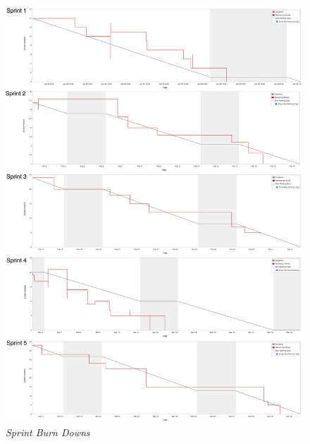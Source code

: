 \vfill
\begin{figure}[!ht]
\centering
\includegraphics*[width=\textwidth]{images/sprints}
\caption{\em Sprint Burn Downs}
\label{fig:sprints}
\end{figure}
\vfill
\clearpage
